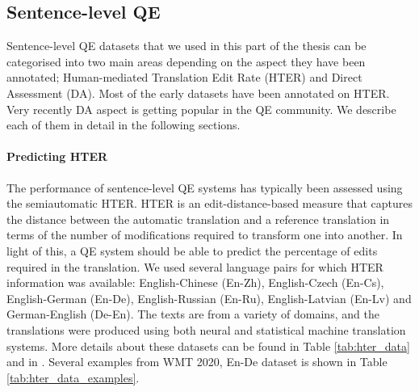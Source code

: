 \subsection{Sentence-level QE}
Sentence-level QE datasets that we used in this part of the thesis can be categorised into two main areas depending on the aspect they have been annotated; Human-mediated Translation Edit Rate (HTER) and Direct Assessment (DA). Most of the early datasets have been annotated on HTER. Very recently DA aspect is getting popular in the QE community. We describe each of them in detail in the following sections.


\paragraph{Predicting HTER}
The performance of sentence-level QE systems has typically been assessed using the semiautomatic HTER. HTER is an edit-distance-based measure that captures the distance between the automatic translation and a reference translation in terms of the number of modifications required to transform one into another. In light of this, a QE system should be able to predict the percentage of edits required in the translation. We used several language pairs for which HTER information was available: English-Chinese (En-Zh), English-Czech (En-Cs), English-German (En-De), English-Russian (En-Ru), English-Latvian (En-Lv) and German-English (De-En). The texts are from a variety of domains, and the translations were produced using both neural and statistical machine translation systems. More details about these datasets can be found in Table \ref{tab:hter_data} and in \autocite{specia-etal-2018-findings,fonseca-etal-2019-findings,specia-etal-2020-findings-wmt}. Several examples from WMT 2020, En-De dataset is shown in Table \ref{tab:hter_data_examples}.

